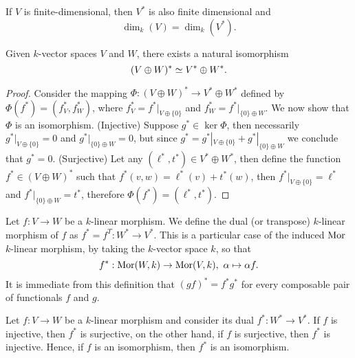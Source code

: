 \begin{proposition}
    If \(V\) is finite-dimensional, then \(V^\ast\) is also finite dimensional and
    \[
        \dim_k(V) = \dim_k (V^\ast).
    \]
\end{proposition}

\begin{proposition}
    Given \(k\)-vector spaces \(V\) and \(W\), there exists a natural isomorphism
    \[
        (V \oplus W)^\ast \simeq V^\ast \oplus W^\ast.
    \]
\end{proposition}

\begin{proof}
    Consider the mapping \(\Phi: (V \oplus W)^\ast \to V^\ast \oplus W^\ast\)
    defined by \(\Phi(f^\ast) = (f^\ast_V, f^\ast_W)\), where \(f^\ast_V =
    f^\ast|_{V \oplus \{0\}} \) and \(f^\ast_W = f^\ast|_{\{0\} \oplus W}\). We
    now show that \(\Phi\) is an isomorphism. (Injective) Suppose \(g^\ast \in
    \ker \Phi\), then necessarily \(g^\ast|_{V\oplus \{0\}} = 0\) and
    \(g^\ast|_{\{0\} \oplus W} = 0\), but since \(g^\ast = g^\ast|_{V\oplus
    \{0\}} + g^\ast|_{\{0\} \oplus W}\) we conclude that \(g^\ast = 0\).
    (Surjective) Let any \((\ell^\ast, t^\ast) \in V^\ast \oplus W^\ast\), then
    define the function \(f^\ast \in (V \oplus W)^\ast\) such that \(f^\ast(v, w)
    = \ell^\ast(v) + t^\ast(w)\), then \(f^\ast|_{V \oplus \{0\}} = \ell^\ast\)
    and \(f^\ast|_{\{0\} \oplus W} = t^\ast\), therefore \(\Phi(f^\ast) =
    (\ell^\ast, t^\ast)\).
\end{proof}

\begin{definition}\label{def:dual-morphism}
    Let \(f : V \to W\) be a \(k\)-linear morphism. We define the dual (or
    transpose) \(k\)-linear morphism of \(f\) as \(f^\ast = f^T : W^\ast \to
    V^\ast\). This is a particular case of the induced \(\operatorname{Mor}\) \(k\)-linear
    morphism, by taking the \(k\)-vector space \(k\), so that
    \[
        f^\ast : \operatorname{Mor}(W, k) \to \operatorname{Mor}(V, k),\ \alpha \mapsto \alpha  f.
    \]
    It is immediate from this definition that \((g f)^{*} = f^{*} g^{*}\) for
    every composable pair of functionals \(f\) and \(g\).
\end{definition}

\begin{proposition}
    Let \(f : V \to W\) be a \(k\)-linear morphism and consider its dual \(f^\ast
    : W^\ast \to V^\ast\). If \(f\) is injective, then \(f^\ast\) is surjective,
    on the other hand, if \(f\) is surjective, then \(f^\ast\) is injective.
    Hence, if \(f\) is an isomorphism, then \(f^*\) is an isomorphism.
\end{proposition}

